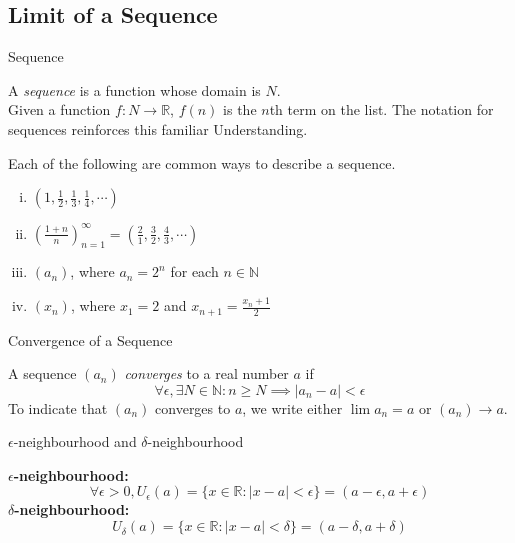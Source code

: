 
\subsection{Limit of a Sequence}

\begin{definition}{Sequence}

    A \textit{sequence} is a function whose domain is $N$.\\
    Given a function $f:N \to \mathbb{R}$, $f(n)$ is the $n$th term on the list. The notation for sequences reinforces this familiar Understanding.
\end{definition}

\begin{example}{Each of the following are common ways to describe a sequence}.

    \begin{enumerate}[(i)]
        \item $ \left( 1,\frac{1}{2},\frac{1}{3},\frac{1}{4},\cdots \right)  $
        \item $ \left( \frac{1+n}{n} \right)_{n=1}^{\infty} = \left( \frac{2}{1},\frac{3}{2},\frac{4}{3},\cdots \right)  $
       \item $(a_n)$, where  $a_n=2^n$ for each $n\in \mathbb{N}$
       \item $(x_n)$, where $x_1=2$ and $x_{n+1}=\frac{x_n+1}{2}$
    \end{enumerate}
\end{example}

\begin{definition}{Convergence of a Sequence}
    
    A sequence $(a_n)$ \textit{converges} to a real number $a$ if \[
        \forall\epsilon,\exists N\in\mathbb{N} : n \ge N \implies |a_n-a|<\epsilon
    \] To indicate that $(a_n)$ converges to $a$, we write either $\lim a_n=a $ or $(a_n) \to a$.
\end{definition}

\begin{definition}{$\epsilon$-neighbourhood and $\delta$-neighbourhood}
    
\textbf{$\epsilon$-neighbourhood:}
    \[ \forall \epsilon > 0, U_\epsilon (a) = \{ x\in\mathbb{R} : |x-a| < \epsilon \} = (a-\epsilon, a+\epsilon) \]
    \textbf{$\delta$-neighbourhood:}
    \[ U_\delta(a) = \{x \in \mathbb{R} : |x-a| < \delta \} = (a-\delta, a+\delta) \]

\end{definition}

